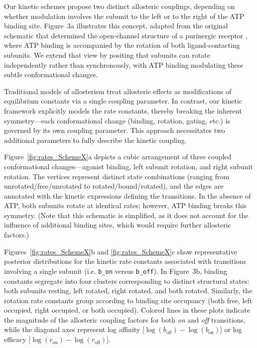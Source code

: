\documentclass[pdflatex,sn-mathphys-num]{sn-jnl}%
\theoremstyle{thmstyleone}%
\theoremstyle{thmstyletwo}%
\theoremstyle{thmstylethree}%
\begin{document}
Our kinetic schemes propose two distinct allosteric couplings, depending on whether modulation involves the subunit to the left or to the right of the ATP binding site. Figure~3a illustrates this concept, adapted from the original schematic that determined the open-channel structure of a purinergic receptor \cite{abierta_p2x}, where ATP binding is accompanied by the rotation of both ligand-contacting subunits. We extend that view by positing that subunits can rotate independently rather than synchronously, with ATP binding modulating these subtle conformational changes.

Traditional models of allosterism treat allosteric effects as modifications of equilibrium constants via a single coupling parameter. In contrast, our kinetic framework explicitly models the rate constants, thereby breaking the inherent symmetry—each conformational change (binding, rotation, gating, etc.) is governed by its own coupling parameter. This approach necessitates two additional parameters to fully describe the kinetic coupling.

Figure~\ref{fig:rates_SchemeX}a depicts a cubic arrangement of three coupled conformational changes—agonist binding, left subunit rotation, and right subunit rotation. The vertices represent distinct state combinations (ranging from unrotated/free/unrotated to rotated/bound/rotated), and the edges are annotated with the kinetic expressions defining the transitions. In the absence of ATP, both subunits rotate at identical rates; however, ATP binding breaks this symmetry. (Note that this schematic is simplified, as it does not account for the influence of additional binding sites, which would require further allosteric factors.)

Figures~\ref{fig:rates_SchemeX}b and \ref{fig:rates_SchemeX}c show representative posterior distributions for the kinetic rate constants associated with transitions involving a single subunit (i.e. \texttt{b\_on} versus \texttt{b\_off}). In Figure~3b, binding constants segregate into four clusters corresponding to distinct structural states: both subunits resting, left rotated, right rotated, and both rotated. Similarly, the rotation rate constants group according to binding site occupancy (both free, left occupied, right occupied, or both occupied). Colored lines in these plots indicate the magnitude of the allosteric coupling factors for both \textit{on} and \textit{off} transitions, while the diagonal axes represent log affinity [$\log(b_{\text{off}})-\log(b_{\text{on}})$] or log efficacy [$\log(r_{\text{on}})-\log(r_{\text{off}})$].
\end{document}
